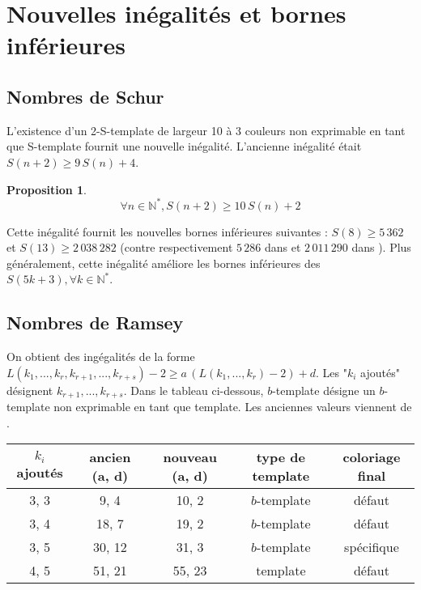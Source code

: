 \documentclass{article}
\newtheorem{proposition}[definition]{Proposition}
\begin{document}
\section{Nouvelles inégalités et bornes inférieures}
\label{sec:bounds}

\subsection{Nombres de Schur}

L'existence d'un 2-S-template de largeur 10 à 3 couleurs non exprimable en tant que S-template fournit une nouvelle inégalité. L'ancienne inégalité était \(S(n + 2) \geqslant 9 \, S(n) + 4\).

\begin{proposition}
	\[\forall n \in \mathbb{N}^*, S(n + 2) \geqslant 10 \, S(n) + 2\]
\end{proposition}

Cette inégalité fournit les nouvelles bornes inférieures suivantes : \(S(8) \geqslant 5\,362\) et \(S(13) \geqslant 2\,038\,282\) (contre respectivement \(5\,286\) dans \cite{RowleyRamsey} et \(2\,011\,290\) dans \cite{schurboyz}). Plus généralement, cette inégalité améliore les bornes inférieures des \(S(5 k + 3), \forall k \in \mathbb{N}^*\).

\subsection{Nombres de Ramsey}

On obtient des ingégalités de la forme \(L(k_1, ..., k_r, k_{r+1}, ..., k_{r+s}) - 2 \geqslant a \, (L(k_1, ..., k_r) - 2) + d\). Les "\(k_i\) ajoutés" désignent \( k_{r+1}, ..., k_{r+s}\). Dans le tableau ci-dessous, \(b\)-template désigne un \(b\)-template non exprimable en tant que template. Les anciennes valeurs viennent de \cite{rowleyramseysat}.
\begin{table}[H]\begin{center}
\begin{tabular}{| c | c | c | c | c |}
	\hline
	\(k_i\) ajoutés & ancien (a, d) & nouveau (a, d) & type de template & coloriage final \\
	\hline
	3, 3 & 9, 4 & 10, 2 & \(b\)-template & défaut \\
	\hline
	3, 4 & 18, 7 & 19, 2 & \(b\)-template & défaut \\
	\hline
	3, 5 & 30, 12 & 31, 3 & \(b\)-template & spécifique \\
	\hline
	4, 5 & 51, 21 & 55, 23 & template & défaut \\
	\hline
\end{tabular}
\end{center}\end{table}
\end{document}
